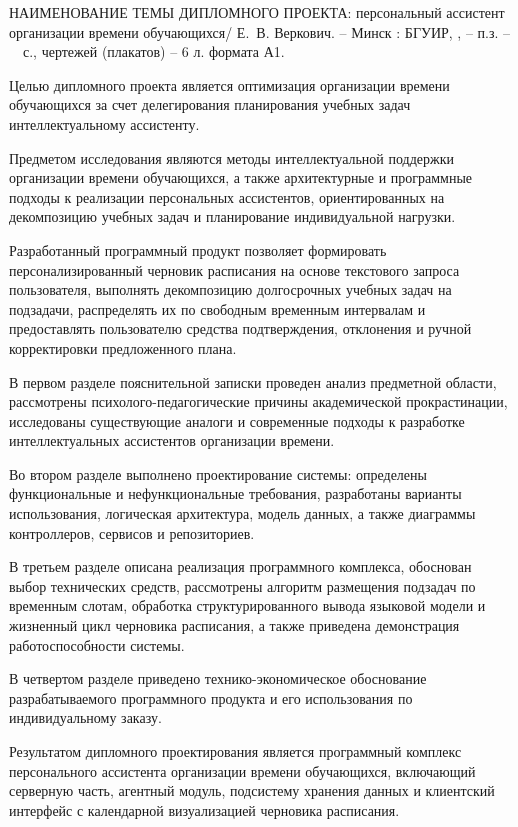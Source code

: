 \thispagestyle{empty}

\MakeUppercase{наименование темы дипломного проекта}: персональный ассистент организации времени обучающихся/ Е.~В. Веркович. -- Минск : БГУИР, \the{}, -- п.з. -- ~\pageref*{LastPage}~с., чертежей (плакатов) -- 6 л. формата А1.

\vspace{4\parsep}


Целью дипломного проекта является оптимизация организации времени обучающихся за счет делегирования планирования учебных задач интеллектуальному ассистенту.

Предметом исследования являются методы интеллектуальной поддержки организации времени обучающихся, а также архитектурные и программные подходы к реализации персональных ассистентов, ориентированных на декомпозицию учебных задач и планирование индивидуальной нагрузки.

Разработанный программный продукт позволяет формировать персонализированный черновик расписания на основе текстового запроса пользователя, выполнять декомпозицию долгосрочных учебных задач на подзадачи, распределять их по свободным временным интервалам и предоставлять пользователю средства подтверждения, отклонения и ручной корректировки предложенного плана.

В первом разделе пояснительной записки проведен анализ предметной области, рассмотрены психолого-педагогические причины академической прокрастинации, исследованы существующие аналоги и современные подходы к разработке интеллектуальных ассистентов организации времени.

Во втором разделе выполнено проектирование системы: определены функциональные и нефункциональные требования, разработаны варианты использования, логическая архитектура, модель данных, а также диаграммы контроллеров, сервисов и репозиториев.

В третьем разделе описана реализация программного комплекса, обоснован выбор технических средств, рассмотрены алгоритм размещения подзадач по временным слотам, обработка структурированного вывода языковой модели и жизненный цикл черновика расписания, а также приведена демонстрация работоспособности системы.

В четвертом разделе приведено технико-экономическое обоснование разрабатываемого программного продукта и его использования по индивидуальному заказу.

Результатом дипломного проектирования является программный комплекс персонального ассистента организации времени обучающихся, включающий серверную часть, агентный модуль, подсистему хранения данных и клиентский интерфейс с календарной визуализацией черновика расписания.

\clearpage
